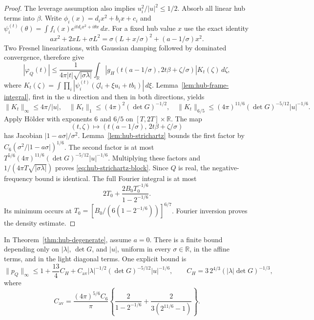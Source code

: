 \begin{proof}
The leverage assumption also implies
$u_i^2/|u|^2\le1/2$.  Absorb all linear hub terms into $\beta$.
Write $\phi_i(x)=d_ix^2+b_ix+c_i$ and
$\psi_i^{(t)}(\theta)=\int f_i(x)e^{itd_ix^2+i\theta x}\,dx$.
For a fixed hub value $x$ use the exact identity
\[
 ax^2+2xL+\sigma L^2
   =\sigma(L+x/\sigma)^2+(a-1/\sigma)x^2.
\]
Two Fresnel linearizations, with Gaussian damping followed by
dominated convergence, therefore give
\[
 |\varphi_Q(t)|\le
 \frac1{4\pi|t|\sqrt{|\sigma\lambda|}}
 \int_{\mathbb R}
 |g_H(t(a-1/\sigma),2t\beta+\zeta/\sigma)|K_t(\zeta)\,d\zeta,
\]
where
$K_t(\zeta)=\int\prod_i
 |\psi_i^{(t)}(\zeta l_i+\xi u_i+tb_i)|\,d\xi$.
Lemma~\ref{lem:hub-frame-integral}, first in the $u$ direction
and then in both directions, yields
\[
 \|K_t\|_\infty\le4\pi/|u|,
 \quad \|K_t\|_1\le(4\pi)^2(\det G)^{-1/2},
 \quad
 \|K_t\|_{6/5}\le
 (4\pi)^{11/6}(\det G)^{-5/12}|u|^{-1/6}.
\]
Apply H\"older with exponents $6$ and $6/5$ on
$[T,2T]\times\mathbb R$.  The map
\[
 (t,\zeta)\longmapsto
 (t(a-1/\sigma),\,2t\beta+\zeta/\sigma)
\]
has Jacobian $|1-a\sigma|/\sigma^2$.
Lemma~\ref{lem:hub-strichartz} bounds the first factor by
$C_6(\sigma^2/|1-a\sigma|)^{1/6}$.
The second factor is at most
$T^{5/6}(4\pi)^{11/6}(\det G)^{-5/12}|u|^{-1/6}$.
Multiplying these factors and $1/(4\pi T\sqrt{|\sigma\lambda|})$
proves \eqref{eq:hub-strichartz-block}.
Since $Q$ is real, the negative-frequency bound is identical.
The full Fourier integral is at most
\[
 2T_0+\frac{2B_0T_0^{-1/6}}{1-2^{-1/6}}.
\]
Its minimum occurs at
$T_0=[B_0/(6(1-2^{-1/6}))]^{6/7}$.
Fourier inversion proves the density estimate.
\end{proof}

\begin{theorem}
\label{thm:hub-degenerate-uniform}
In Theorem~\ref{thm:hub-degenerate}, assume $a=0$.
There is a finite bound depending only on
$|\lambda|$, $\det G$, and $|u|$, uniform in every
$\sigma\in\mathbb R$, in the affine terms, and in the light
diagonal terms.  One explicit bound is
\[
 \|p_Q\|_\infty\le
 1+\frac{13}{4}C_H+
 C_{\mathrm{av}}|\lambda|^{-1/2}
                         (\det G)^{-5/12}|u|^{-1/6},
 \qquad
 C_H=3\,2^{4/3}(|\lambda|\det G)^{-1/3},
\]
where
\[
 C_{\mathrm{av}}=
 \frac{(4\pi)^{5/6}C_6}{\pi}
 \left\{\frac2{1-2^{-1/6}}
             +\frac{2}{3(2^{11/6}-1)}\right\}.
\]
\end{theorem}

